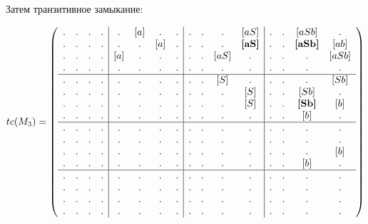 \begin{example}
Затем транзитивное замыкание:

\begin{align}
tc(M_3) =
\left(\begin{array}{c c c c | c c c c | c c c c | c c c c } 
. & . & . & .  &  . & [a] & . & .  &  . & . & . & [aS]           &  . & . & [aSb]          & .     \\
. & . & . & .  &  . & . & [a] & .  &  . & . & . & \textbf{[aS]}  &  . & . & \textbf{[aSb]} & [ab]  \\
. & . & . & .  &  [a] & . & . & .  &  . & . & [aS] & .           &  . & . & .              & [aSb] \\
. & . & . & .  &  . & . & . & .    &  . & . & . & .              &  . & . & .              & .     \\
\hline
. & . & . & .  &  . & . & . & .    &  . & . & [S] & .            &  . & . & .             & [Sb]    \\
. & . & . & .  &  . & . & . & .    &  . & . & . & [S]            &  . & . & [Sb]          & .    \\
. & . & . & .  &  . & . & . & .    &  . & . & . & [S]            &  . & . & \textbf{[Sb]} & [b]  \\
. & . & . & .  &  . & . & . & .    &  . & . & . & .              &  . & . & [b]           & .    \\
\hline                                                              
. & . & . & .  &  . & . & . & .    &  . & . & . & .              &  . & . & . & .   \\
. & . & . & .  &  . & . & . & .    &  . & . & . & .              &  . & . & . & .   \\
. & . & . & .  &  . & . & . & .    &  . & . & . & .              &  . & . & . & [b] \\
. & . & . & .  &  . & . & . & .    &  . & . & . & .              &  . & . & [b] & . \\
\hline                                                              
. & . & . & .  &  . & . & . & .    &  . & . & . & .              &  . & . & . & .   \\
. & . & . & .  &  . & . & . & .    &  . & . & . & .              &  . & . & . & .   \\
. & . & . & .  &  . & . & . & .    &  . & . & . & .              &  . & . & . & .   \\
. & . & . & .  &  . & . & . & .    &  . & . & . & .              &  . & . & . & . 
\end{array}\right)
\end{align}


\end{example}
